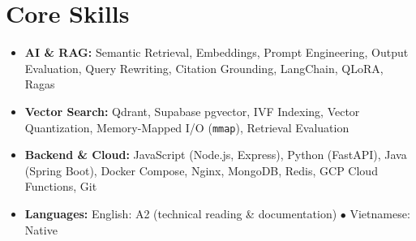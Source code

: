 \documentclass[10pt,letterpaper]{article}
\begin{document}
\section{Core Skills}
\begin{itemize}[leftmargin=0pt, label={}, itemsep=1.0pt]
  \item \small{\textbf{AI \& RAG:} Semantic Retrieval, Embeddings, Prompt Engineering, Output Evaluation, Query Rewriting, Citation Grounding, LangChain, QLoRA, Ragas}
  \item \small{\textbf{Vector Search:} Qdrant, Supabase pgvector, IVF Indexing, Vector Quantization, Memory-Mapped I/O (\texttt{mmap}), Retrieval Evaluation}
  \item \small{\textbf{Backend \& Cloud:} JavaScript (Node.js, Express), Python (FastAPI), Java (Spring Boot), Docker Compose, Nginx, MongoDB, Redis, GCP Cloud Functions, Git}
  \item \small{\textbf{Languages:} English: A2 (technical reading \& documentation) $\bullet$ Vietnamese: Native}
\end{itemize}
\vspace{2pt}

\end{document}
